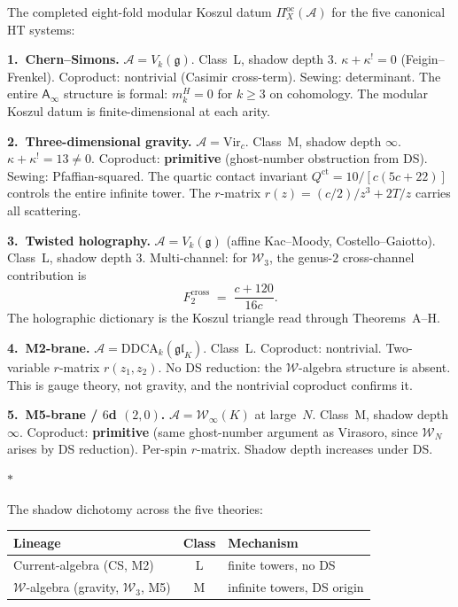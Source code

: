 \documentclass[11pt]{article}
\newcommand{\cA}{\mathcal{A}}
\newcommand{\cW}{\mathcal{W}}
\newcommand{\fg}{\mathfrak{g}}
\newcommand{\Ainf}{\mathsf{A}_{\infty}}
\newcommand{\sep}{\bigskip\begin{center}$*$\end{center}\medskip}
\begin{document}
The completed eight-fold modular Koszul datum
$\Pi^{\mathrm{oc}}_X(\cA)$ for the five canonical HT systems:

\medskip

\noindent
\textbf{1.\ Chern--Simons.}\enspace
$\cA = V_k(\fg)$.  Class~L, shadow depth $3$.
$\kappa + \kappa^! = 0$ (Feigin--Frenkel).  Coproduct:
nontrivial (Casimir cross-term).  Sewing: determinant.  The
entire $\Ainf$ structure is formal: $m_k^H = 0$ for $k \geq 3$ on cohomology.
The modular Koszul datum is finite-dimensional at each arity.

\medskip

\noindent
\textbf{2.\ Three-dimensional gravity.}\enspace
$\cA = \mathrm{Vir}_c$.  Class~M, shadow depth $\infty$.
$\kappa + \kappa^! = 13 \neq 0$.  Coproduct: \textbf{primitive}
(ghost-number obstruction from DS).  Sewing:
Pfaffian-squared.  The quartic contact invariant
$Q^{\mathrm{ct}} = 10/[c(5c+22)]$ controls the entire infinite
tower.  The $r$-matrix
$r(z) = (c/2)/z^3 + 2T/z$ carries all scattering.

\medskip

\noindent
\textbf{3.\ Twisted holography.}\enspace
$\cA = V_k(\fg)$ (affine Kac--Moody, Costello--Gaiotto).
Class~L, shadow depth $3$.  Multi-channel: for $\cW_3$, the
genus-$2$ cross-channel contribution is
\[
F_2^{\mathrm{cross}} \;=\; \frac{c + 120}{16c}.
\]
The holographic dictionary is the Koszul triangle read through
Theorems~A--H.

\medskip

\noindent
\textbf{4.\ M2-brane.}\enspace
$\cA = \mathrm{DDCA}_k(\mathfrak{gl}_K)$.  Class~L.  Coproduct:
nontrivial.  Two-variable $r$-matrix $r(z_1, z_2)$.  No DS
reduction: the $\cW$-algebra structure is absent.  This is
gauge theory, not gravity, and the nontrivial coproduct
confirms it.

\medskip

\noindent
\textbf{5.\ M5-brane / $6$d $(2,0)$.}\enspace
$\cA = \cW_\infty(K)$ at large~$N$.  Class~M, shadow depth
$\infty$.  Coproduct: \textbf{primitive} (same ghost-number
argument as Virasoro, since $\cW_N$ arises by DS reduction).
Per-spin $r$-matrix.  Shadow depth increases under DS.

\sep

The shadow dichotomy across the five theories:

\begin{center}
\small
\renewcommand{\arraystretch}{1.15}
\begin{tabular}{@{}lcl@{}}
\textbf{Lineage} & \textbf{Class} & \textbf{Mechanism} \\
\hline
Current-algebra (CS, M2) & L & finite towers, no DS \\[3pt]
$\cW$-algebra (gravity, $\cW_3$, M5) & M & infinite towers,
  DS origin
\end{tabular}
\end{center}
\end{document}

